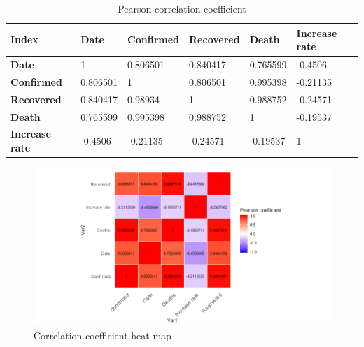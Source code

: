 \documentclass[a4paper, 11pt,twoside=true]{scrartcl}
\begin{document}
\begin{table}[H]
	\centering
	\caption{Pearson correlation coefficient} \label{P3T2}
	\begin{tabular}{|l|l|l|l|l|l|}
		\hline
		\textbf{Index}  & \textbf{Date} & \textbf{Confirmed} & \textbf{Recovered} & \textbf{Death} & \textbf{Increase rate} \\ \hline
		\textbf{Date}  & 1           & 0.806501     & 0.840417     & 0.765599     & -0.4506      \\ \hline
		\textbf{Confirmed} & 0.806501    & 1            & 0.806501     & 0.995398     & -0.21135     \\ \hline
		\textbf{Recovered} & 0.840417    & 0.98934      & 1            & 0.988752     & -0.24571     \\ \hline
		\textbf{Death} & 0.765599    & 0.995398     & 0.988752     & 1            & -0.19537     \\ \hline
		\textbf{Increase rate} & -0.4506     & -0.21135     & -0.24571     & -0.19537     & 1            \\ \hline
	\end{tabular}
\end{table}

\begin{figure}[h]
	\small
	\centering
	\includegraphics[width=17cm]{P3F2}
	\caption{Correlation coefficient heat map} \label{P3F2}
\end{figure}
\end{document}
